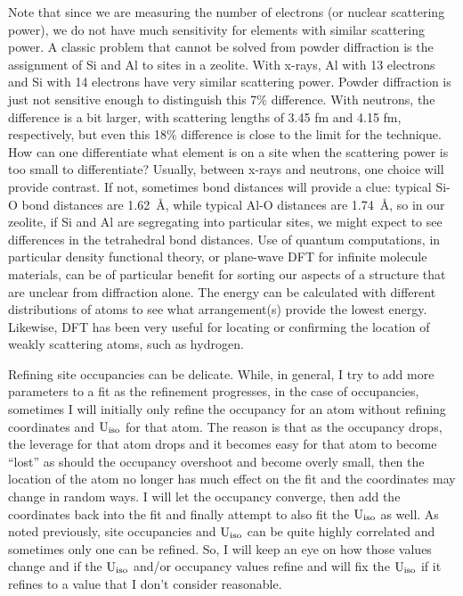 Note that since we are measuring the number of electrons (or nuclear scattering power), we do not have much sensitivity for elements with similar scattering power. A classic problem that cannot be solved from powder diffraction is the assignment of Si and Al to sites in a zeolite. With x-rays, Al with 13 electrons and Si with 14 electrons have very similar scattering power. Powder diffraction is just not sensitive enough to distinguish this 7\% difference. 
With neutrons, the difference is a bit larger, with scattering lengths of 3.45 fm and 4.15 fm, respectively, but even this 18\% difference is close to the limit for the technique. 
How can one differentiate what element is on a site when the scattering power is too small to differentiate? 
Usually, between x-rays and neutrons, one choice will provide contrast. 
If not, sometimes bond distances will provide a clue: typical Si-O bond distances are 1.62~\AA, while typical Al-O distances are 1.74~\AA, 
so in our zeolite, if Si and Al are segregating into particular sites, we might expect to see differences in the tetrahedral bond distances.
Use of quantum computations, in particular density functional theory, or plane-wave DFT for infinite molecule materials, can be of particular benefit for sorting our aspects of a structure that are unclear from diffraction alone.
The energy can be calculated with different distributions of atoms to see what arrangement(s) provide the lowest energy. 
Likewise, DFT has been very useful for locating or confirming the location of weakly scattering atoms, such as hydrogen. 

Refining site occupancies can be delicate. While, in general, I try to add more parameters to a fit as the refinement progresses, in the case of occupancies, sometimes I will initially only refine the occupancy for an atom without refining coordinates and  $\rm U_{iso}$ for that atom. The reason is that as the occupancy drops, the leverage for that atom drops and it becomes easy for that atom to become ``lost'' as should the occupancy overshoot and become overly small, then the location of the atom no longer has much effect on the fit and the coordinates may change in random ways. I will let the occupancy converge, then add the coordinates back into the fit and finally attempt to also fit the $\rm U_{iso}$ as well. As noted previously, site occupancies and $\rm U_{iso}$ can be quite highly correlated and sometimes only one can be refined. So, I will keep an eye on how those values change and if the $\rm U_{iso}$ and/or occupancy values refine and will fix the  $\rm U_{iso}$ if it refines to a value that I don't consider reasonable.

